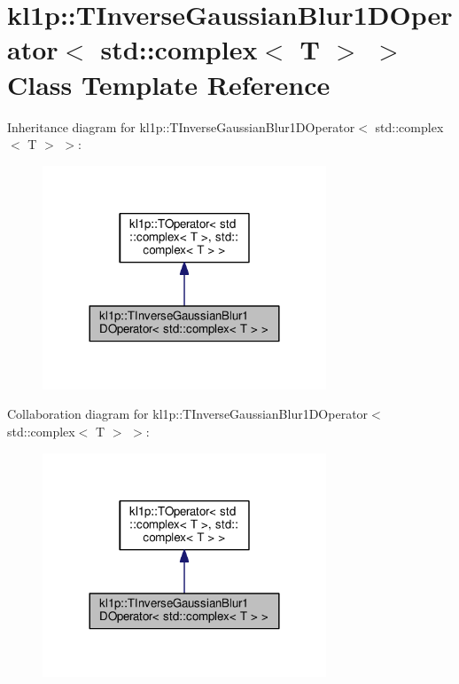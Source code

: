\hypertarget{classkl1p_1_1TInverseGaussianBlur1DOperator_3_01std_1_1complex_3_01T_01_4_01_4}{}\section{kl1p\+:\+:T\+Inverse\+Gaussian\+Blur1\+D\+Operator$<$ std\+:\+:complex$<$ T $>$ $>$ Class Template Reference}
\label{classkl1p_1_1TInverseGaussianBlur1DOperator_3_01std_1_1complex_3_01T_01_4_01_4}


Inheritance diagram for kl1p\+:\+:T\+Inverse\+Gaussian\+Blur1\+D\+Operator$<$ std\+:\+:complex$<$ T $>$ $>$\+:
\nopagebreak
\begin{figure}[H]
\begin{center}
\leavevmode
\includegraphics[width=240pt]{classkl1p_1_1TInverseGaussianBlur1DOperator_3_01std_1_1complex_3_01T_01_4_01_4__inherit__graph}
\end{center}
\end{figure}


Collaboration diagram for kl1p\+:\+:T\+Inverse\+Gaussian\+Blur1\+D\+Operator$<$ std\+:\+:complex$<$ T $>$ $>$\+:
\nopagebreak
\begin{figure}[H]
\begin{center}
\leavevmode
\includegraphics[width=240pt]{classkl1p_1_1TInverseGaussianBlur1DOperator_3_01std_1_1complex_3_01T_01_4_01_4__coll__graph}
\end{center}
\end{figure}
